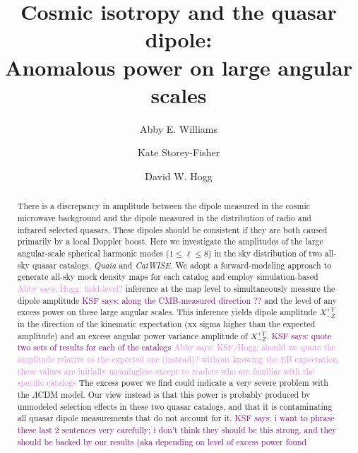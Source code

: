 \documentclass[modern]{aastex631}
\newcommand{\abby}[1]{\textcolor{violet}{Abby says: #1}}
\newcommand{\ksf}[1]{\textcolor{purple}{KSF says: #1}}
\newcommand{\catwise}{\textsl{CatWISE}\xspace}
\newcommand{\quaia}{\textsl{Quaia}\xspace}
\begin{document}
\title{Cosmic isotropy and the quasar dipole:\\
Anomalous power on large angular scales}
\author[0000-0001-6069-5383]{Abby E. Williams}

\author[0000-0001-8764-7103]{Kate Storey-Fisher}

\author[0000-0003-2866-9403]{David W. Hogg}

\begin{abstract}\noindent %
    There is a discrepancy in amplitude between the dipole measured in the cosmic microwave background and the dipole measured in the distribution of radio and infrared selected quasars.
    These dipoles should be consistent if they are both caused primarily by a local Doppler boost.
    Here we investigate the amplitudes of the large angular-scale spherical harmonic modes ($1\leq\ell\leq 8$) in the sky distribution of two all-sky quasar catalogs, \quaia and \catwise.
    We adopt a forward-modeling approach to generate all-sky mock density maps for each catalog and employ  simulation-based \abby{Hogg: field-level?} inference at the map level to simultaneously measure the dipole amplitude \ksf{along the CMB-measured direction ??} and the level of any excess power on these large angular scales.
    This inference yields dipole amplitude $X^{+Y}_{-Z}$ in the direction of the kinematic expectation (xx sigma higher than the expected amplitude) and an excess angular power variance amplitude of $X^{+Y}_{-Z}$. \ksf{quote two sets of results for each of the catalogs} \abby{KSF/Hogg: should we quote the amplitude relative to the expected one (instead)? without knowing the EB expectation, these values are initially meaningless except to readers who are familiar with the specific catalogs}
    The excess power we find could indicate a very severe problem with the $\Lambda$CDM model.
    Our view instead is that this power is probably produced by unmodeled selection effects in these two quasar catalogs, and that it is contaminating all quasar dipole measurements that do not account for it. \ksf{i want to phrase these last 2 sentences very carefully; i don't think they should be this strong, and they should be backed by our results (aka depending on level of excess power found}
\end{abstract}
\end{document}
